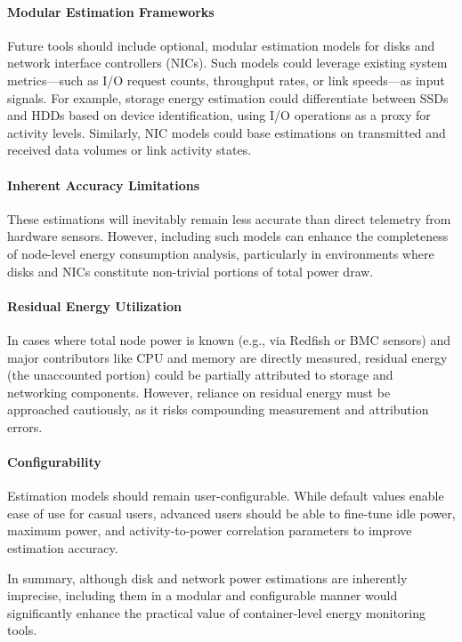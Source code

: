 \paragraph{Modular Estimation Frameworks}
Future tools should include optional, modular estimation models for disks and network interface controllers (NICs). Such models could leverage existing system metrics---such as I/O request counts, throughput rates, or link speeds---as input signals. For example, storage energy estimation could differentiate between SSDs and HDDs based on device identification, using I/O operations as a proxy for activity levels. Similarly, NIC models could base estimations on transmitted and received data volumes or link activity states.

\paragraph{Inherent Accuracy Limitations}
These estimations will inevitably remain less accurate than direct telemetry from hardware sensors. However, including such models can enhance the completeness of node-level energy consumption analysis, particularly in environments where disks and NICs constitute non-trivial portions of total power draw.

\paragraph{Residual Energy Utilization}
In cases where total node power is known (e.g., via Redfish or BMC sensors) and major contributors like CPU and memory are directly measured, residual energy (the unaccounted portion) could be partially attributed to storage and networking components. However, reliance on residual energy must be approached cautiously, as it risks compounding measurement and attribution errors.

\paragraph{Configurability}
Estimation models should remain user-configurable. While default values enable ease of use for casual users, advanced users should be able to fine-tune idle power, maximum power, and activity-to-power correlation parameters to improve estimation accuracy.

In summary, although disk and network power estimations are inherently imprecise, including them in a modular and configurable manner would significantly enhance the practical value of container-level energy monitoring tools.

